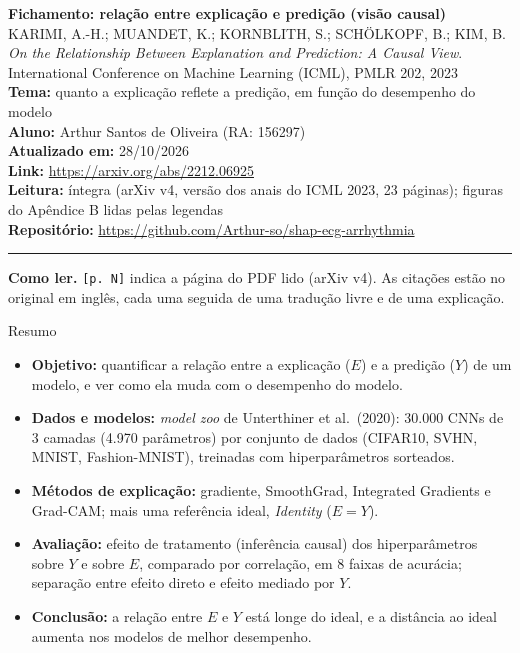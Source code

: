 \documentclass[11pt,a4paper]{article}
\begin{document}
\begin{center}
    {\LARGE \textbf{Fichamento: relação entre explicação e predição (visão causal)}} \\[0.35em]
    {\large KARIMI, A.-H.; MUANDET, K.; KORNBLITH, S.; SCHÖLKOPF, B.; KIM, B. \textit{On the Relationship Between Explanation and Prediction: A Causal View}. International Conference on Machine Learning (ICML), PMLR 202, 2023} \\[0.3em]
    \textbf{Tema:} quanto a explicação reflete a predição, em função do desempenho do modelo \\[0.2em]
    \textbf{Aluno:} Arthur Santos de Oliveira (RA: 156297) \\[0.2em]
    \textbf{Atualizado em:} 28/10/2026 \\[0.2em]
    \textbf{Link:} \url{https://arxiv.org/abs/2212.06925} \\[0.2em]
    \textbf{Leitura:} íntegra (arXiv v4, versão dos anais do ICML 2023, 23 páginas); figuras do Apêndice B lidas pelas legendas \\[0.2em]
    \textbf{Repositório:} \url{https://github.com/Arthur-so/shap-ecg-arrhythmia}
\end{center}
\vspace{-0.5em}
\hrule
\vspace{0.8em}

\textbf{Como ler.} \texttt{[p. N]} indica a página do PDF lido (arXiv v4). As citações estão no original em inglês, cada uma seguida de uma tradução livre e de uma explicação.

\begin{infobox}[note]{Resumo}
\begin{itemize}
  \item \textbf{Objetivo:} quantificar a relação entre a explicação ($E$) e a predição ($Y$) de um modelo, e ver como ela muda com o desempenho do modelo.
  \item \textbf{Dados e modelos:} \textit{model zoo} de Unterthiner et al.\ (2020): 30.000 CNNs de 3 camadas (4.970 parâmetros) por conjunto de dados (CIFAR10, SVHN, MNIST, Fashion-MNIST), treinadas com hiperparâmetros sorteados.
  \item \textbf{Métodos de explicação:} gradiente, SmoothGrad, Integrated Gradients e Grad-CAM; mais uma referência ideal, \textit{Identity} ($E = Y$).
  \item \textbf{Avaliação:} efeito de tratamento (inferência causal) dos hiperparâmetros sobre $Y$ e sobre $E$, comparado por correlação, em 8 faixas de acurácia; separação entre efeito direto e efeito mediado por $Y$.
  \item \textbf{Conclusão:} a relação entre $E$ e $Y$ está longe do ideal, e a distância ao ideal aumenta nos modelos de melhor desempenho.
\end{itemize}
\end{infobox}
\end{document}
